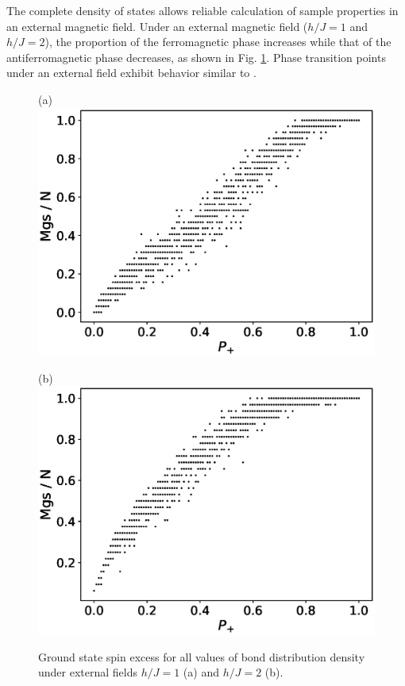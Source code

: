 \documentclass[utf8, babel, sor, jor, amsmath, amssymb, reprint]{elsarticle} %
\begin{document}
The complete density of states allows reliable calculation of sample properties in an external magnetic field. Under an external magnetic field ($h/J = 1$ and $h/J = 2$), the proportion of the ferromagnetic phase increases while that of the antiferromagnetic phase decreases, as shown in Fig. \ref{fig:Mgs(P+)_H}. Phase transition points under an external field exhibit behavior similar to \cite{trukhin4855337thermodynamic}.

\begin{figure}[H]
	\begin{minipage}[h]{0.45\linewidth}
		\centering (a)
		\includegraphics[width=1\linewidth]{images/Mgs(P+)_H1.eps}
	\end{minipage}
	\hfill
	\begin{minipage}[h]{0.45\linewidth}
		\centering (b)
		\includegraphics[width=1\linewidth]{images/Mgs(P+)_H2.eps}
	\end{minipage}
	\caption{Ground state spin excess for all values of bond distribution density under external fields $h/J = 1$ (a) and $h/J = 2$ (b).}
	\label{fig:Mgs(P+)_H}
\end{figure}
\end{document}
